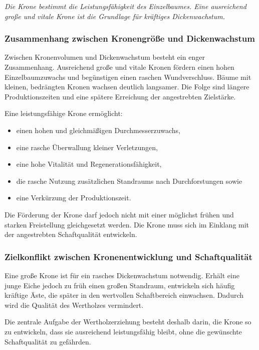 \documentclass[twocolumn, bibliography=totoc, abstract=true]{scrartcl}
\begin{document}
\emph{Die Krone bestimmt die Leistungsfähigkeit des Einzelbaumes. Eine ausreichend große und vitale Krone ist die Grundlage für kräftiges Dickenwachstum.}

\subsubsection{Zusammenhang zwischen Kronengröße und Dickenwachstum}

Zwischen Kronenvolumen und Dickenwachstum besteht ein enger Zusammenhang. Ausreichend große und vitale Kronen fördern einen hohen Einzelbaumzuwachs und begünstigen einen raschen Wundverschluss. Bäume mit kleinen, bedrängten Kronen wachsen deutlich langsamer. Die Folge sind längere Produktionszeiten und eine spätere Erreichung der angestrebten Zielstärke.

Eine leistungsfähige Krone ermöglicht:

\begin{itemize}
\item einen hohen und gleichmäßigen Durchmesserzuwachs,
\item eine rasche Überwallung kleiner Verletzungen,
\item eine hohe Vitalität und Regenerationsfähigkeit,
\item die rasche Nutzung zusätzlichen Standraums nach Durchforstungen sowie
\item eine Verkürzung der Produktionszeit.
\end{itemize}

Die Förderung der Krone darf jedoch nicht mit einer möglichst frühen und starken Freistellung gleichgesetzt werden. Die Krone muss sich im Einklang mit der angestrebten Schaftqualität entwickeln.

\subsubsection{Zielkonflikt zwischen Kronenentwicklung und Schaftqualität}

Eine große Krone ist für ein rasches Dickenwachstum notwendig. Erhält eine junge Eiche jedoch zu früh einen großen Standraum, entwickeln sich häufig kräftige Äste, die später in den wertvollen Schaftbereich einwachsen. Dadurch wird die Qualität des Wertholzes vermindert.

Die zentrale Aufgabe der Wertholzerziehung besteht deshalb darin, die Krone so zu entwickeln, dass sie ausreichend leistungsfähig bleibt, ohne die gewünschte Schaftqualität zu gefährden.
\end{document}
